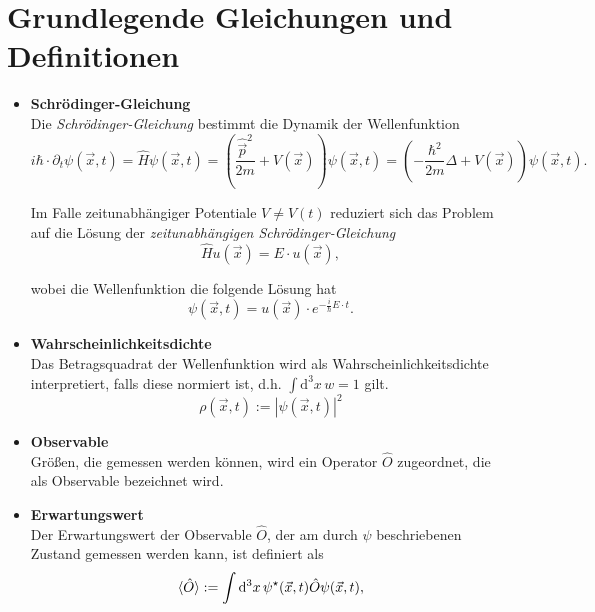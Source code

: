 \documentclass{article}
\newcommand{\diff}{\mathrm{d}}
\newcommand{\lr}[1]{\left(#1\right)}
\begin{document}
\section{Grundlegende Gleichungen und Definitionen}
	\begin{itemize}
		\item \textbf{Schrödinger-Gleichung}\\
		Die \textit{Schrödinger-Gleichung} bestimmt die Dynamik der Wellenfunktion
			\begin{equation}
				\label{schrödinger gleichung}
				i\hbar \cdot \partial_t\psi(\vec{x},t) = \hat{H}\psi(\vec{x},t) = \lr{\frac{\hat{\vec{p}}^2}{2m} + V(\vec{x})} \psi(\vec{x},t) = \lr{-\frac{\hbar^2}{2m}\Delta + V(\vec{x})} \psi(\vec{x},t).
		\end{equation}
		
		Im Falle zeitunabhängiger Potentiale $V\neq V(t)$ reduziert sich das Problem auf die Lösung der \textit{zeitunabhängigen Schrödinger-Gleichung}
			\begin{equation}
				\hat{H} u(\vec{x}) = E \cdot u(\vec{x}),
			\end{equation}
		
		wobei die Wellenfunktion die folgende Lösung hat
			\begin{equation}
				\psi(\vec{x},t) = u(\vec{x}) \cdot e^{-\frac{i}{\hbar} E \cdot t}.
			\end{equation}
		
		
		\item \textbf{Wahrscheinlichkeitsdichte}\\
		Das Betragsquadrat der Wellenfunktion wird als Wahrscheinlichkeitsdichte interpretiert, falls diese normiert ist, d.h. $\int \diff^3x \, w = 1$ gilt.
			\begin{equation}
				\rho(\vec{x},t) := |\psi(\vec{x},t)|^2
			\end{equation}
		
		
		\item \textbf{Observable}\\
		Größen, die gemessen werden können, wird ein Operator $\hat{O}$ zugeordnet, die als Observable bezeichnet wird.
		
		
		\item \textbf{Erwartungswert}\\
		Der Erwartungswert der Observable $\hat{O}$, der am durch $\psi$ beschriebenen Zustand gemessen werden kann, ist definiert als
			\begin{equation}
				\braket{\hat{O}} := \int \diff^3x \, \psi^\star(\vec{x},t) \hat{O} \psi(\vec{x},t),
			\end{equation}
		

\end{itemize}
\end{document}
